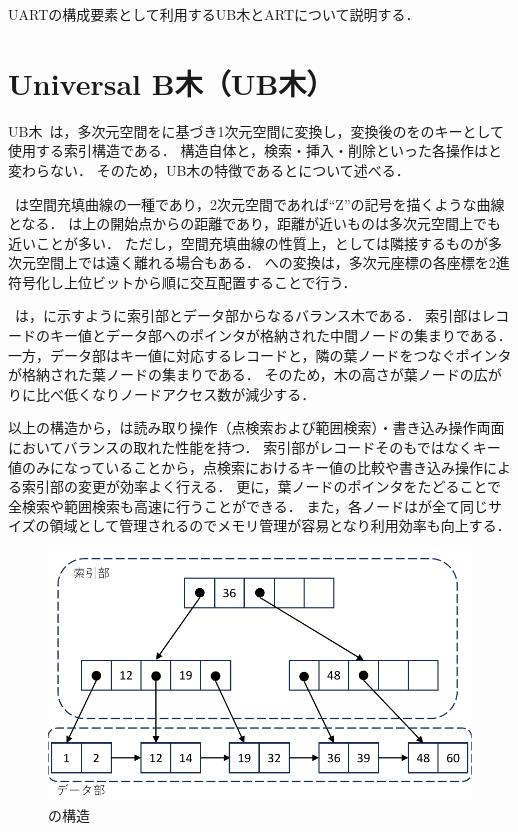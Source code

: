 UARTの構成要素として利用するUB木とARTについて説明する．

\section{Universal B木（UB木）}

UB木~\cite{vldb:ramsak2000}は，多次元空間を\ZCurve に基づき1次元空間に変換し，変換後の\ZValue を\BTree のキーとして使用する索引構造である．
構造自体と，検索・挿入・削除といった各操作は\BTree と変わらない．
そのため，UB木の特徴である\ZCurve と\BTree について述べる．

\ZCurve ~\cite{acm:Gaede1998}は空間充填曲線の一種であり，2次元空間であれば``Z''の記号を描くような曲線となる．
\ZValue は\ZCurve 上の開始点からの距離であり，距離が近いものは多次元空間上でも近いことが多い．
ただし，空間充填曲線の性質上，\ZValue としては隣接するものが多次元空間上では遠く離れる場合もある．
\ZValue への変換は，多次元座標の各座標を2進符号化し上位ビットから順に交互配置することで行う．

\BTree ~\cite{book:Kitagawa1996}は，\Fig{\ref{fig:bptree}}に示すように索引部とデータ部からなるバランス木である．
索引部はレコードのキー値とデータ部へのポインタが格納された中間ノードの集まりである．
一方，データ部はキー値に対応するレコードと，隣の葉ノードをつなぐポインタが格納された葉ノードの集まりである．
そのため，木の高さが葉ノードの広がりに比べ低くなりノードアクセス数が減少する．

以上の構造から，\BTree は読み取り操作（点検索および範囲検索）・書き込み操作両面においてバランスの取れた性能を持つ．
索引部がレコードそのもではなくキー値のみになっていることから，点検索におけるキー値の比較や書き込み操作による索引部の変更が効率よく行える．
更に，葉ノードのポインタをたどることで全検索や範囲検索も高速に行うことができる．
また，各ノードはが全て同じサイズの領域として管理されるのでメモリ管理が容易となり利用効率も向上する．

\begin{figure}[tb]
  \centering
  \includegraphics{./figures/fig_bptree.pdf}
  \caption{\BTree の構造}
  \label{fig:bptree}
\end{figure}

